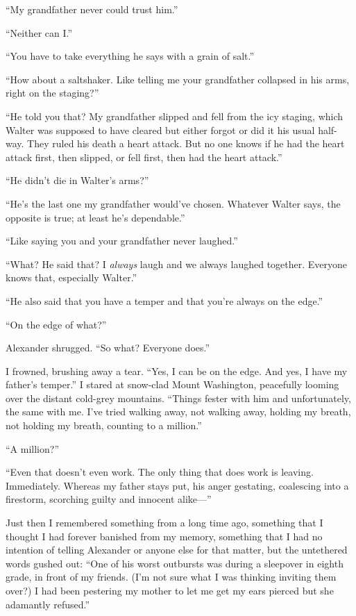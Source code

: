 ``My grandfather never could trust him.''

``Neither can I.''

``You have to take everything he says with a grain of salt.''

``How about a saltshaker. Like telling me your grandfather collapsed in
his arms, right on the staging?''

``He told you that? My grandfather slipped and fell from the icy
staging, which Walter was supposed to have cleared but either forgot or
did it his usual half-way. They ruled his death a heart attack. But no
one knows if he had the heart attack first, then slipped, or fell first,
then had the heart attack.''

``He didn't die in Walter's arms?''

``He's the last one my grandfather would've chosen. Whatever Walter
says, the opposite is true; at least he's dependable.''

``Like saying you and your grandfather never laughed.''

``What? He said that? I \emph{always} laugh and we always laughed
together. Everyone knows that, especially Walter.''

``He also said that you have a temper and that you're always on the
edge.''

``On the edge of what?''

Alexander shrugged. ``So what? Everyone does.''

I frowned, brushing away a tear. ``Yes, I can be on the edge. And yes, I
have my father's temper.'' I stared at snow-clad Mount Washington,
peacefully looming over the distant cold-grey mountains. ``Things fester
with him and unfortunately, the same with me. I've tried walking away,
not walking away, holding my breath, not holding my breath, counting to
a million.''

``A million?''

``Even that doesn't even work. The only thing that does work is leaving.
Immediately. Whereas my father stays put, his anger gestating,
coalescing into a firestorm, scorching guilty and innocent alike---''

Just then I remembered something from a long time ago, something that I
thought I had forever banished from my memory, something that I had no
intention of telling Alexander or anyone else for that matter, but the
untethered words gushed out: ``One of his worst outbursts was during a
sleepover in eighth grade, in front of my friends. (I'm not sure what I
was thinking inviting them over?) I had been pestering my mother to let
me get my ears pierced but she adamantly refused.''

